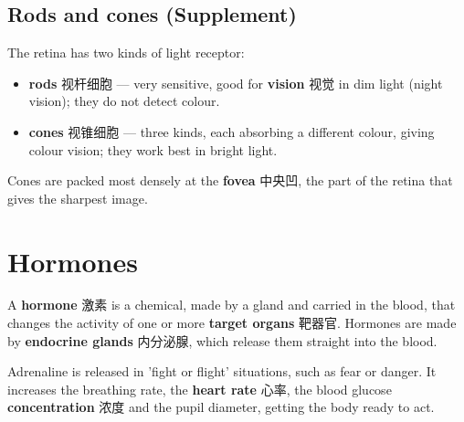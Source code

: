 \documentclass[11pt]{article}
\begin{document}
\subsection*{Rods and cones (Supplement)}

The retina has two kinds of light receptor:

\begin{itemize}
\item \textbf{rods} 视杆细胞 — very sensitive, good for \textbf{vision} 视觉 in dim light (night vision); they do not detect colour.

\item \textbf{cones} 视锥细胞 — three kinds, each absorbing a different colour, giving colour vision; they work best in bright light.

\end{itemize}

Cones are packed most densely at the \textbf{fovea} 中央凹, the part of the retina that gives the sharpest image.

\section*{Hormones}

A \textbf{hormone} 激素 is a chemical, made by a gland and carried in the blood, that changes the activity of one or more \textbf{target organs} 靶器官. Hormones are made by \textbf{endocrine glands} 内分泌腺, which release them straight into the blood.

\begin{center}
\end{center}

Adrenaline is released in 'fight or flight' situations, such as fear or danger. It increases the breathing rate, the \textbf{heart rate} 心率, the blood glucose \textbf{concentration} 浓度 and the pupil diameter, getting the body ready to act.
\end{document}
